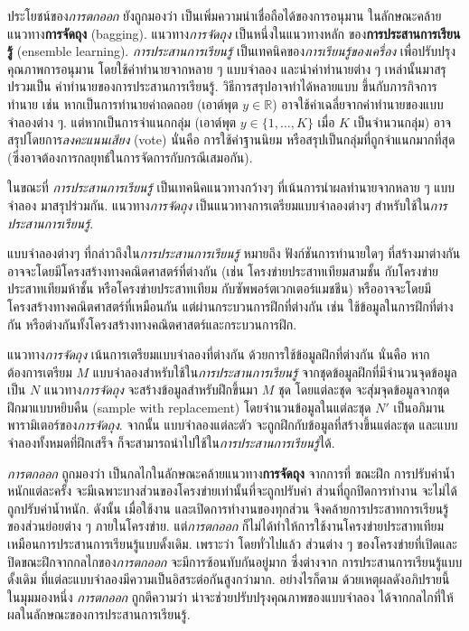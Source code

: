 ประโยชน์ของ\textit{การตกออก}
ยังถูกมองว่า เป็นเพิ่มความน่าเชื่อถือได้ของการอนุมาน
ในลักษณะคล้ายแนวทาง\textbf{การจัดถุง} (bagging).
แนวทาง\textit{การจัดถุง}
เป็นหนึ่งในแนวทางหลัก ของ\textbf{การประสานการเรียนรู้}
(ensemble learning).
\textit{การประสานการเรียนรู้}
เป็นเทคนิคของ\textit{การเรียนรู้ของเครื่อง}
เพื่อปรับปรุงคุณภาพการอนุมาน
โดยใช้ค่าทำนายจากหลาย ๆ แบบจำลอง และนำค่าทำนายต่าง ๆ เหล่านั้นมาสรุปรวมเป็น ค่าทำนายของการประสานการเรียนรู้.
วิธีการสรุปอาจทำได้หลายแบบ ขึ้นกับภารกิจการทำนาย
เช่น หากเป็นการทำนายค่าถดถอย (เอาต์พุต $y \in \mathbb{R}$)
อาจใช้ค่าเฉลี่ยจากค่าทำนายของแบบจำลองต่าง ๆ.
แต่หากเป็นการจำแนกกลุ่ม (เอาต์พุต $y \in \{1, \ldots, K\}$ เมื่อ $K$ เป็นจำนวนกลุ่ม)
อาจสรุปโดยการ\textit{ลงคะแนนเสียง} (vote) นั่นคือ การใช้ค่าฐานนิยม หรือสรุปเป็นกลุ่มที่ถูกจำแนกมากที่สุด (ซึ่งอาจต้องการกลยุทธ์ในการจัดการกับกรณีเสมอกัน).

ในขณะที่ \textit{การประสานการเรียนรู้} เป็นเทคนิคแนวทางกว้างๆ ที่เน้นการนำผลทำนายจากหลาย ๆ แบบจำลอง มาสรุปร่วมกัน.
แนวทาง\textit{การจัดถุง} เป็นแนวทางการเตรียมแบบจำลองต่างๆ สำหรับใช้ใน\textit{การประสานการเรียนรู้}.

แบบจำลองต่างๆ ที่กล่าวถึงใน\textit{การประสานการเรียนรู้}
หมายถึง ฟังก์ชันการทำนายใดๆ ที่สร้างมาต่างกัน อาจจะโดยมีโครงสร้างทางคณิตศาสตร์ที่ต่างกัน (เช่น โครงข่ายประสาทเทียมสามชั้น กับโครงข่ายประสาทเทียมห้าชั้น หรือโครงข่ายประสาทเทียม กับซัพพอร์ตเวกเตอร์แมชชีน)
หรืออาจจะโดยมีโครงสร้างทางคณิตศาสตร์ที่เหมือนกัน แต่ผ่านกระบวนการฝึกที่ต่างกัน
เช่น ใช้ข้อมูลในการฝึกที่ต่างกัน
หรือต่างกันทั้งโครงสร้างทางคณิตศาสตร์และกระบวนการฝึก.

แนวทาง\textit{การจัดถุง}
เน้นการเตรียมแบบจำลองที่ต่างกัน ด้วยการใช้ข้อมูลฝึกที่ต่างกัน
นั่นคือ 
หากต้องการเตรียม $M$ แบบจำลองสำหรับใช้ใน\textit{การประสานการเรียนรู้}
จากชุดข้อมูลฝึกที่มีจำนวนจุดข้อมูลเป็น $N$
แนวทาง\textit{การจัดถุง} จะสร้างข้อมูลสำหรับฝึกขึ้นมา $M$ ชุด 
โดยแต่ละชุด จะสุ่มจุดข้อมูลจากชุดฝึกมาแบบหยิบคืน (sample with replacement) โดยจำนวนข้อมูลในแต่ละชุด $N'$ เป็นอภิมานพารามิเตอร์ของ\textit{การจัดถุง}.
จากนั้น แบบจำลองแต่ละตัว จะถูกฝึกกับข้อมูลที่สร้างขึ้นแต่ละชุด
และแบบจำลองทั้งหมดที่ฝึกเสร็จ ก็จะสามารถนำไปใช้ใน\textit{การประสานการเรียนรู้}ได้.

\textit{การตกออก} ถูกมองว่า เป็นกลไกในลักษณะคล้ายแนวทาง\textbf{การจัดถุง}
จากการที่ ขณะฝึก
การปรับค่าน้ำหนักแต่ละครั้ง จะมีเฉพาะบางส่วนของโครงข่ายเท่านั้นที่จะถูกปรับค่า
ส่วนที่ถูกปิดการทำงาน จะไม่ได้ถูกปรับค่าน้ำหนัก.
ดังนั้น เมื่อใช้งาน และเปิดการทำงานของทุกส่วน
จึงคล้ายการประสาทการเรียนรู้ของส่วนย่อยต่าง ๆ ภายในโครงข่าย.
แต่\textit{การตกออก} ก็ไม่ได้ทำให้การใช้งานโครงข่ายประสาทเทียมเหมือนการประสานการเรียนรู้แบบดั้งเดิม.
เพราะว่า
โดยทั่วไปแล้ว ส่วนต่าง ๆ ของโครงข่ายที่เปิดและปิดขณะฝึกจากกลไกของ\textit{การตกออก} จะมีการซ้อนทับกันอยู่มาก
ซึ่งต่างจาก การประสานการเรียนรู้แบบดั้งเดิม ที่แต่ละแบบจำลองมีความเป็นอิสระต่อกันสูงกว่ามาก.
อย่างไรก็ตาม ด้วยเหตุผลดังอภิปรายนี้ 
ในมุมมองหนึ่ง
\textit{การตกออก} ถูกตีความว่า น่าจะช่วยปรับปรุงคุณภาพของแบบจำลอง ได้จากกลไกที่ให้ผลในลักษณะของการประสานการเรียนรู้.

